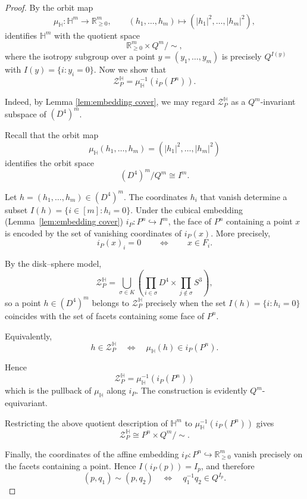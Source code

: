 \documentclass[11pt,a4paper]{article}
\numberwithin{equation}{section}
\theoremstyle{named}
\begin{document}
\begin{proof}
By \cite[\S 3.2]{ho} the orbit map
\[
\mu_{\mathbb H}:\mathbb H^m\to \mathbb R_{\ge0}^m,
\qquad
(h_1,\ldots,h_m)
\longmapsto
(|h_1|^2,\ldots,|h_m|^2),
\]
identifies $\mathbb H^m$ with the quotient space
\[
\mathbb R_{\ge0}^m\times Q^m/\!\sim,
\]
where the isotropy subgroup over a point $y=(y_1,\ldots,y_m)$ is precisely $Q^{I(y)}$ with $I(y)=\{i:y_i=0\}$. Now we show that  
\[
\mathcal Z_P^{\mathbb H}
=
\mu_{\mathbb H}^{-1}(i_P(P^n)).
\]

\noindent
Indeed, by Lemma \ref{lem:embedding cover}, we may regard
\(\mathcal Z_P^{\mathbb H}\) as a \(Q^m\)-invariant subspace of \((D^4)^m\).

Recall that the orbit map
\[
\mu_{\mathbb H}(h_1,\ldots,h_m)
=
(|h_1|^2,\ldots,|h_m|^2)
\]
identifies the orbit space
\[
(D^4)^m/Q^m\cong I^m.
\]

Let $h=(h_1,\ldots,h_m)\in (D^4)^m$. The coordinates \(h_i\) that vanish determine a subset $I(h)=\{i\in[m]:h_i=0\}$. Under the cubical embedding (Lemma~\ref{lem:embedding cover}) $i_P:P^n\hookrightarrow I^m$, the face of \(P^n\) containing a point \(x\) is encoded by the set of vanishing coordinates of \(i_P(x)\). More precisely,
\[
i_P(x)_i=0
\qquad\Longleftrightarrow\qquad
x\in F_i.
\]

By the disk--sphere model,
\[
\mathcal Z_P^{\mathbb H}
=
\bigcup_{\sigma\in K}
\left(
\prod_{i\in\sigma}D^4
\times
\prod_{j\notin\sigma}S^3
\right),
\]
so a point \(h\in(D^4)^m\) belongs to \(\mathcal Z_P^{\mathbb H}\) precisely when the set \(I(h)=\{i:h_i=0\}\) coincides with the set of facets containing some face of \(P^n\).

Equivalently,
\[
h\in\mathcal Z_P^{\mathbb H}
\quad\Longleftrightarrow\quad
\mu_{\mathbb H}(h)\in i_P(P^n).
\]

Hence
\[
\mathcal Z_P^{\mathbb H}
=
\mu_{\mathbb H}^{-1}(i_P(P^n))
\]
which is the pullback of \(\mu_{\mathbb H}\) along \(i_P\). The construction is evidently \(Q^m\)-equivariant.


Restricting the above quotient description of $\mathbb H^m$ to $\mu_{\mathbb H}^{-1}(i_P(P^n))$ gives $$\mathcal Z_P^{\mathbb H} \cong P^n\times Q^m/\!\sim.$$

Finally, the coordinates of the affine embedding $i_P:P^n\hookrightarrow \mathbb R_{\ge0}^m$ vanish precisely on the facets containing a point. Hence $I(i_P(p))=I_p$, and therefore
\[
(p,q_1)\sim(p,q_2)
\quad\Longleftrightarrow\quad
q_1^{-1}q_2\in Q^{I_p}.
\]
\end{proof}
\end{document}
